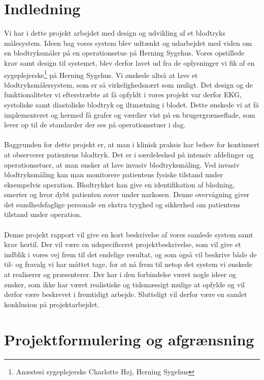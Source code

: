 \chapter{Indledning}
Vi har i dette projekt arbejdet med design og udvikling af et blodtryks målesystem. Ideen bag vores system blev udtænkt og udarbejdet med viden om en blodtryksmåler på en operationsstue på Herning Sygehus. Vores opstillede krav samt design til systemet, blev derfor lavet ud fra de oplysninger vi fik af en sygeplejerske\footnote{Anæstesi sygeplejerske Charlotte Høj, Herning Sygehus} på Herning Sygehus. Vi ønskede altså at lave et blodtryksmålersystem, som er så virkelighedsnært som muligt. Det design og de funktionaliteter vi efterstræbte at få opfyldt i vores projekt var derfor EKG, systoliske samt diastoliske blodtryk og iltmætning i blodet. Dette ønskede vi at få implementeret og hermed få grafer og værdier vist på en brugergrænseflade, som lever op til de standarder der ses på operationsstuer i dag. \\
\\
Baggrunden for dette projekt er, at man i klinisk praksis har behov for kontinuert at observerer patientens blodtryk. Det er i særdeleshed på intensiv afdelinger og operationsstuer, at man ønsker at lave invasiv blodtryksmåling. Ved invasiv blodtryksmåling kan man monitorere patientens fysiske tilstand under eksempelvis operation. Blodtrykket kan give en identifikation af blødning, smerter og hvor dybt patienten sover under narkosen. Denne overvågning giver det sundhedsfaglige personale en ekstra tryghed og sikkerhed om patientens tilstand under operation. \\
\\
Denne projekt rapport vil give en kort beskrivelse af vores samlede system samt krav hertil. Der vil være en udspecificeret projektbeskrivelse, som vil give et indblik i vores vej frem til det endelige resultat, og som også vil beskrive både de til- og fravalg vi har måttet tage, for at nå frem til netop det system vi ønskede at realiserer og præsenterer. Der har i den forbindelse været nogle ideer og ønsker, som ikke har været realistiske og tidsmæssigt mulige at opfylde og vil derfor være beskrevet i fremtidigt arbejde. Slutteligt vil derfor være en samlet konklusion på projektarbejdet.
\chapter{Projektformulering og afgrænsning}
